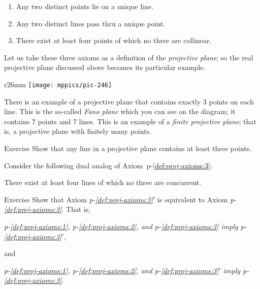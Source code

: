 \begin{framed}

\begin{enumerate}[p-I.]
\item\label{def:proj-axioms:1} Any two distinct points lie on a unique line.
\item\label{def:proj-axioms:2} Any two distinct lines pass thru a unique point.
\item\label{def:proj-axioms:3} There exist at least four points of which no three are collinear.
\end{enumerate}

\end{framed}

Let us take these three axioms as a definition of the \emph{projective plane};
so the real projective plane discussed above becomes its particular example.

{

\begin{wrapfigure}{r}{26mm}
\vskip-0mm
\centering
\texttt{[image: mppics/pic-246]}
\end{wrapfigure}

There is an example of a projective plane that contains exactly 3 points on each line.
This is the so-called \emph{Fano plane} which you can see on the diagram;
it contains $7$ points and $7$ lines.
This is an example of a \emph{finite projective plane};
that is, a projective plane with finitely many points.

}

\begin{thm}{Exercise}\label{ex:finite-pp}
Show that any line in a projective plane contains at least three points.
\end{thm}


Consider the following dual analog of Axiom~p-\ref{def:proj-axioms:3}:

\begin{framed}
There exist at least four lines of which no three are concurrent.
\end{framed}

\begin{thm}{Exercise}\label{ex:3=3'}
Show that Axiom \textit{p-\ref{def:proj-axioms:3}$'$} is equivalent to Axiom \textit{p-\ref{def:proj-axioms:3}}.
That is, 
\begin{center}
\textit{p-\ref{def:proj-axioms:1}, p-\ref{def:proj-axioms:2}, and p-\ref{def:proj-axioms:3} imply  p-\ref{def:proj-axioms:3}$'$},
\end{center}
and 
\begin{center}
\textit{p-\ref{def:proj-axioms:1}, p-\ref{def:proj-axioms:2}, and p-\ref{def:proj-axioms:3}$'$ imply p-\ref{def:proj-axioms:3}}.
\end{center}

\end{thm}

